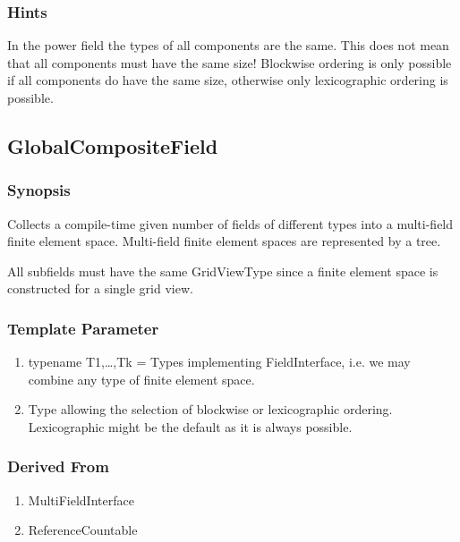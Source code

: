 \documentclass[11pt,a4paper,DIV11,%
notitlepage,oneside,abstracton,%
bibtotoc]{scrartcl}
\begin{document}
\subsubsection{Hints}

In the power field the types of all components are the same. This does
not mean that all components must have the same size! Blockwise
ordering is only possible if all components do have the same size,
otherwise only lexicographic ordering is possible.

\subsection{GlobalCompositeField}

\subsubsection{Synopsis}

Collects a compile-time given number of fields of different types into
a multi-field finite element space. 
Multi-field finite element spaces are represented by a tree.

All subfields must have the same GridViewType since a finite element
space is constructed for a single grid view.

\subsubsection{Template Parameter}

\begin{enumerate}[1)]
\item typename T1,\ldots,Tk = Types implementing FieldInterface, 
i.e. we may combine any type of finite element space. 
\item Type allowing the selection of blockwise or lexicographic
  ordering. Lexicographic might be the default as it is always possible.
\end{enumerate}

\subsubsection{Derived From}

\begin{enumerate}[1)]
\item MultiFieldInterface
\item ReferenceCountable
\end{enumerate}
\end{document}
